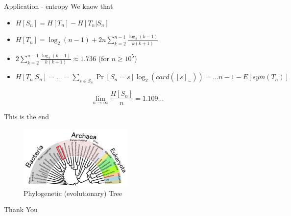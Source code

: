 \documentclass{beamer}
\begin{document}
\begin{frame}{Application - entropy}
We know that
\begin{itemize}
\item $H[S_n] = H[T_n] - H[T_n|S_n]$
\item $H[T_n] = \log_2(n-1) + 2 n \sum_{k=2}^{n-1} \frac{\log_2(k-1)}{k(k+1)}$
\item $2 \sum_{k=2}^{n-1} \frac{\log_2(k-1)}{k(k+1)} \approx 1.736$ (for $n\geq 10^5$)
\item $H[T_n|S_n] = \ldots = \sum_{s\in S_n} \Pr[S_n=s]\log_2(card([s]_\sim)) = \ldots
n-1-E[sym(T_n)]$
\end{itemize}

\begin{theorem}
$$
  \lim_{n\to\infty} \frac{H[S_n]}{n} = 1.109...
$$
\end{theorem}
\end{frame}


\begin{frame}{This is the end}

\begin{figure}
\centering
\includegraphics[width=0.5\textwidth]{PhylogeneticTree}
\caption{Phylogenetic (evolutionary) Tree}
\end{figure}

\begin{block}{}
\begin{center}
{\Huge Thank You}
\end{center}
\end{block}

\end{frame}
\end{document}
